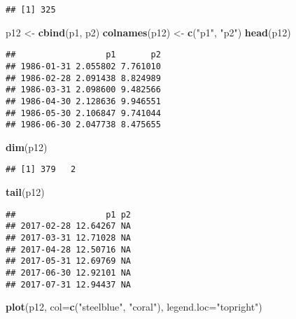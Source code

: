 \documentclass[
]{article}
\newenvironment{Shaded}{\begin{snugshade}}{\end{snugshade}}
\newcommand{\AttributeTok}[1]{\textcolor[rgb]{0.13,0.29,0.53}{#1}}
\newcommand{\FunctionTok}[1]{\textcolor[rgb]{0.13,0.29,0.53}{\textbf{#1}}}
\newcommand{\NormalTok}[1]{#1}
\newcommand{\OtherTok}[1]{\textcolor[rgb]{0.56,0.35,0.01}{#1}}
\newcommand{\StringTok}[1]{\textcolor[rgb]{0.31,0.60,0.02}{#1}}
\begin{document}
\begin{verbatim}
## [1] 325
\end{verbatim}

\begin{Shaded}
\begin{Highlighting}[]
\NormalTok{p12 }\OtherTok{\textless{}{-}} \FunctionTok{cbind}\NormalTok{(p1, p2)}
\FunctionTok{colnames}\NormalTok{(p12) }\OtherTok{\textless{}{-}} \FunctionTok{c}\NormalTok{(}\StringTok{"p1"}\NormalTok{, }\StringTok{"p2"}\NormalTok{)}
\FunctionTok{head}\NormalTok{(p12)}
\end{Highlighting}
\end{Shaded}

\begin{verbatim}
##                  p1       p2
## 1986-01-31 2.055802 7.761010
## 1986-02-28 2.091438 8.824989
## 1986-03-31 2.098600 9.482566
## 1986-04-30 2.128636 9.946551
## 1986-05-30 2.106847 9.741044
## 1986-06-30 2.047738 8.475655
\end{verbatim}

\begin{Shaded}
\begin{Highlighting}[]
\FunctionTok{dim}\NormalTok{(p12)}
\end{Highlighting}
\end{Shaded}

\begin{verbatim}
## [1] 379   2
\end{verbatim}

\begin{Shaded}
\begin{Highlighting}[]
\FunctionTok{tail}\NormalTok{(p12)}
\end{Highlighting}
\end{Shaded}

\begin{verbatim}
##                  p1 p2
## 2017-02-28 12.64267 NA
## 2017-03-31 12.71028 NA
## 2017-04-28 12.50716 NA
## 2017-05-31 12.69769 NA
## 2017-06-30 12.92101 NA
## 2017-07-31 12.94437 NA
\end{verbatim}

\begin{Shaded}
\begin{Highlighting}[]
\FunctionTok{plot}\NormalTok{(p12, }\AttributeTok{col=}\FunctionTok{c}\NormalTok{(}\StringTok{"steelblue"}\NormalTok{, }\StringTok{"coral"}\NormalTok{), }\AttributeTok{legend.loc=}\StringTok{"topright"}\NormalTok{)}
\end{Highlighting}
\end{Shaded}
\end{document}
